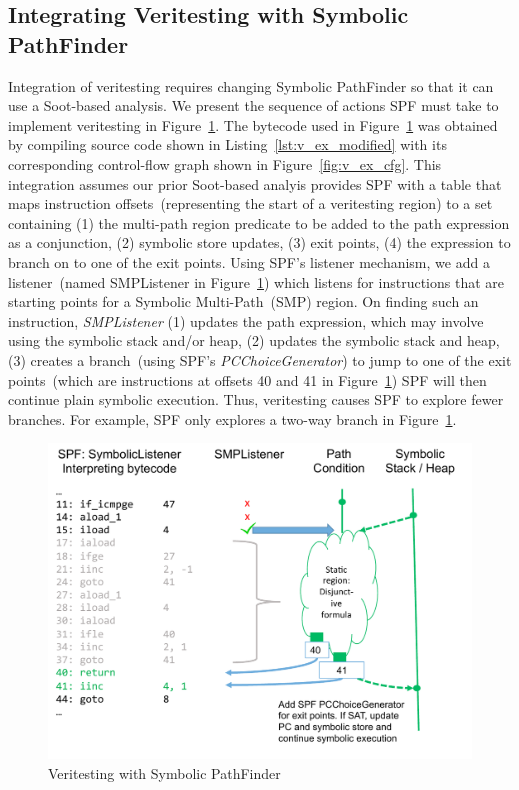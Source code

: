 \subsection{Integrating Veritesting with Symbolic PathFinder}
%
Integration of veritesting requires changing Symbolic PathFinder so that it can 
use a Soot-based analysis.
%
We present the sequence of actions SPF must take to implement veritesting in 
Figure~\ref{fig:spf_veritesting}.
%
The bytecode used in Figure~\ref{fig:spf_veritesting} was obtained by compiling 
source code shown in Listing~\ref{lst:v_ex_modified} with its corresponding 
control-flow graph shown in Figure~\ref{fig:v_ex_cfg}.
%
This integration assumes our prior Soot-based analyis provides SPF 
with a table that maps instruction offsets~(representing the start of a 
veritesting region) to a set containing (1) the multi-path region predicate to be 
added to the path expression as a conjunction, (2) symbolic store
updates, (3) exit points, (4) the expression to branch on to one of the exit points.
%
Using SPF\rq s listener mechanism, we add a listener~(named SMPListener in Figure~\ref{fig:spf_veritesting}) which listens for instructions that are starting points for a Symbolic Multi-Path~(SMP) region.
%
On finding such an instruction, \textit{SMPListener} 
(1) updates the path expression, which may involve using the symbolic stack and/or heap, 
(2) updates the symbolic stack and heap, 
(3) creates a branch~(using SPF's \textit{PCChoiceGenerator}) to 
jump to one of the exit points~(which are instructions at offsets 40 and
41 in Figure~\ref{fig:spf_veritesting})
%
SPF will then continue plain symbolic execution.
%
Thus, veritesting causes SPF to explore fewer branches.
%
For example, SPF only explores a two-way branch in Figure~\ref{fig:spf_veritesting}.
%
\begin{figure}[]
\caption{Veritesting with Symbolic PathFinder}
\label{fig:spf_veritesting}
\includegraphics[width=\columnwidth]{figures/spf_veritesting}
\end{figure}
%
